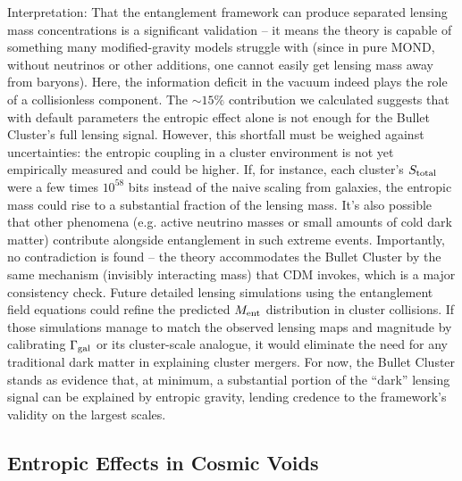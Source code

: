 \documentclass[11pt]{article}
\begin{document}
Interpretation: That the entanglement framework can produce separated lensing mass concentrations is a significant validation – it means the theory is capable of something many modified-gravity models struggle with (since in pure MOND, without neutrinos or other additions, one cannot easily get lensing mass away from baryons). Here, the information deficit in the vacuum indeed plays the role of a collisionless component. The $\sim 15\%$ contribution we calculated suggests that with default parameters the entropic effect alone is not enough for the Bullet Cluster’s full lensing signal. However, this shortfall must be weighed against uncertainties: the entropic coupling in a cluster environment is not yet empirically measured and could be higher. If, for instance, each cluster’s $S_{\rm total}$ were a few times $10^{58}$ bits instead of the naive scaling from galaxies, the entropic mass could rise to a substantial fraction of the lensing mass. It’s also possible that other phenomena (e.g. active neutrino masses or small amounts of cold dark matter) contribute alongside entanglement in such extreme events. Importantly, no contradiction is found – the theory accommodates the Bullet Cluster by the same mechanism (invisibly interacting mass) that CDM invokes, which is a major consistency check. Future detailed lensing simulations using the entanglement field equations could refine the predicted $M_{\rm ent}$ distribution in cluster collisions. If those simulations manage to match the observed lensing maps and magnitude by calibrating $\Gamma_{\rm gal}$ or its cluster-scale analogue, it would eliminate the need for any traditional dark matter in explaining cluster mergers. For now, the Bullet Cluster stands as evidence that, at minimum, a substantial portion of the “dark” lensing signal can be explained by entropic gravity, lending credence to the framework’s validity on the largest scales.

\subsection*{Entropic Effects in Cosmic Voids}
\end{document}
